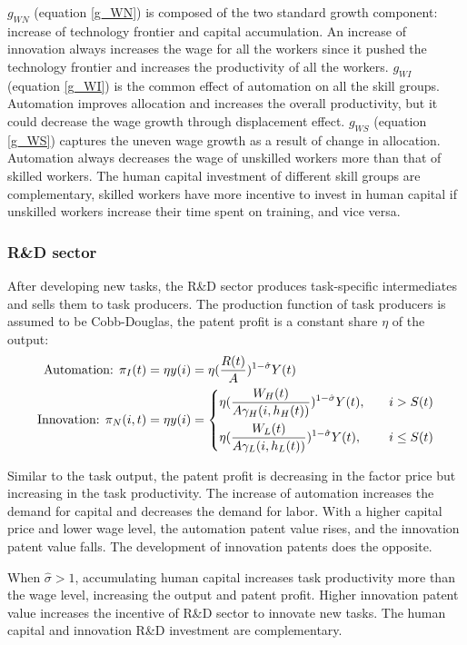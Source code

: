 \documentclass[12pt]{article}
\begin{document}
$g_{WN}$ (equation \ref{g_WN}) is composed of the two standard growth component: increase of technology frontier and capital accumulation. An increase of innovation always increases the wage for all the workers since it pushed the technology frontier and increases the productivity of all the workers. $g_{WI}$ (equation \ref{g_WI}) is the common effect of automation on all the skill groups. Automation improves allocation and increases the overall productivity, but it could decrease the wage growth through displacement effect. $g_{WS}$ (equation \ref{g_WS}) captures the uneven wage growth as a result of change in allocation. Automation always decreases the wage of unskilled workers more than that of skilled workers. The human capital investment of different skill groups are complementary, skilled workers have more incentive to invest in human capital if unskilled workers increase their time spent on training, and vice versa. 

\subsubsection*{R\&D sector}
After developing new tasks, the R\&D sector produces task-specific intermediates and sells them to task producers. The production function of task producers is assumed to be Cobb-Douglas, the patent profit is a constant share $\eta$ of the output: 
\begin{align*}
\text{Automation: } \pi_I(t)& =\eta y(i) = \eta(\frac{R(t)}{A})^{1-\hat{\sigma}}Y(t)\\
\text{Innovation: } \pi_N(i,t)&= \eta y(i) = 
\begin{dcases}
\eta(\frac{W_H(t)}{A\gamma_H(i,h_H(t))})^{1-\hat{\sigma}}Y(t),  \quad & i>S(t)  \\
\eta(\frac{W_L(t)}{A\gamma_L(i,h_L(t))})^{1-\hat{\sigma}}Y(t),  \quad & i \leq S(t)
\end{dcases}
\end{align*}

Similar to the task output, the patent profit is decreasing in the factor price but increasing in the task productivity. The increase of automation increases the demand for capital and decreases the demand for labor. With a higher capital price and lower wage level, the automation patent value rises, and the innovation patent value falls. The development of innovation patents does the opposite. 

When $\hat{\sigma}>1$, accumulating human capital increases task productivity more than the wage level, increasing the output and patent profit. Higher innovation patent value increases the incentive of R\&D sector to innovate new tasks. The human capital and innovation R\&D investment are complementary. 
\end{document}
